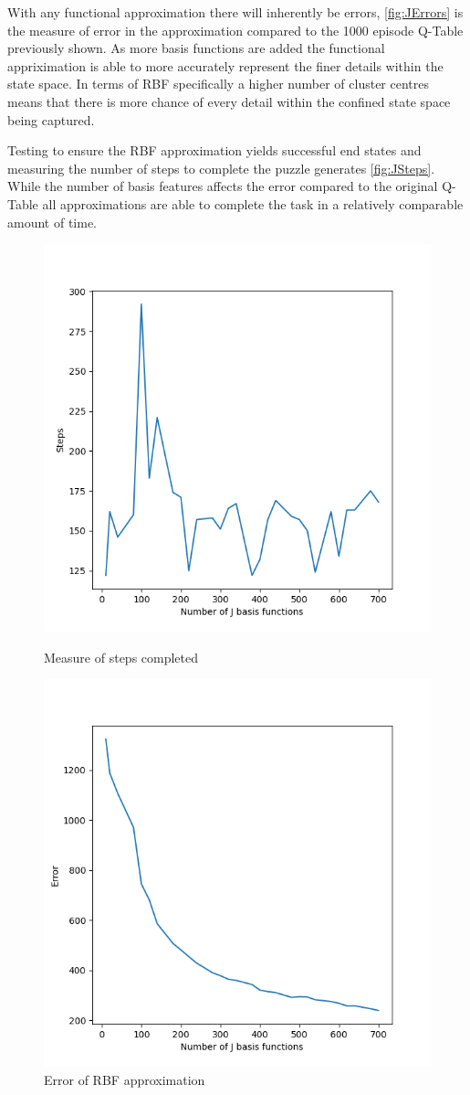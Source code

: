 \documentclass[sigconf]{acmart}
\begin{document}
With any functional approximation there will inherently be errors, \autoref{fig:JErrors} is the measure of error in the approximation compared to the 1000 episode Q-Table previously shown. 
As more basis functions are added the functional appriximation is able to more accurately represent the finer details within the state space. 
In terms of RBF specifically a higher number of cluster centres means that there is more chance of every detail within the confined state space being captured.

Testing to ensure the RBF approximation yields successful end states and measuring the number of steps to complete the puzzle generates \autoref{fig:JSteps}. 
While the number of basis features affects the error compared to the original Q-Table all approximations are able to complete the task in a relatively comparable amount of time.
\begin{figure}
  \begin{minipage}{.45\textwidth}
    \centering
    \includegraphics[width=.6\linewidth]{../MCar/JSteps.png}
    \caption{Measure of steps completed}
    \label{fig:JSteps}
  \end{minipage}
  \begin{minipage}{.45\textwidth}
    \centering
    \includegraphics[width=.6\linewidth]{../MCar/JErrors.png}
    \caption{Error of RBF approximation}
    \label{fig:JErrors}
  \end{minipage}
\end{figure}
\end{document}
